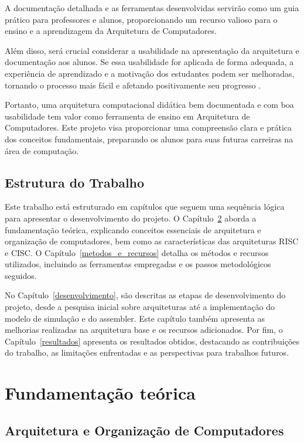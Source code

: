\documentclass[
	12pt,				%
	openright,			%
	oneside,			%
	a4paper,			%
	english,			%
	french,				%
	spanish,			%
	brazil,				%
	]{abntex2}
\begin{document}
A documentação detalhada e as ferramentas desenvolvidas servirão como um guia prático para professores e alunos, proporcionando um recurso valioso para o ensino e a aprendizagem da Arquitetura de Computadores.

Além disso, será crucial considerar a usabilidade na apresentação da arquitetura e documentação aos alunos. Se essa usabilidade for aplicada de forma adequada, a experiência de aprendizado e a motivação dos estudantes podem ser melhoradas, tornando o processo mais fácil e afetando positivamente seu progresso \cite{dimitrijevic_usability_2020}.

Portanto, uma arquitetura computacional didática bem documentada e com boa usabilidade tem valor como ferramenta de ensino em Arquitetura de Computadores. Este projeto visa proporcionar uma compreensão clara e prática dos conceitos fundamentais, preparando os alunos para suas futuras carreiras na área de computação.

\section{Estrutura do Trabalho}

Este trabalho está estruturado em capítulos que seguem uma sequência lógica para apresentar o desenvolvimento do projeto. O Capítulo~\ref{cap_fund_teorica} aborda a fundamentação teórica, explicando conceitos essenciais de arquitetura e organização de computadores, bem como as características das arquiteturas RISC e CISC. O Capítulo~\ref{metodos_e_recursos} detalha os métodos e recursos utilizados, incluindo as ferramentas empregadas e os passos metodológicos seguidos.

No Capítulo~\ref{desenvolvimento}, são descritas as etapas de desenvolvimento do projeto, desde a pesquisa inicial sobre arquiteturas até a implementação do modelo de simulação e do assembler. Este capítulo também apresenta as melhorias realizadas na arquitetura base e os recursos adicionados. Por fim, o Capítulo~\ref{resultados} apresenta os resultados obtidos, destacando as contribuições do trabalho, as limitações enfrentadas e as perspectivas para trabalhos futuros.

\chapter{Fundamentação teórica}\label{cap_fund_teorica}

\section{Arquitetura e Organização de Computadores}
\end{document}
